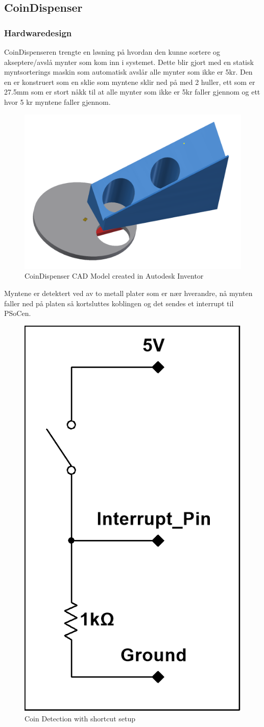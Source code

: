 \documentclass[Rapport/Rapport_main.tex]{subfiles}
\begin{document}
\subsection{CoinDispenser}
\subsubsection{Hardwaredesign}
CoinDispenseren trengte en løsning på hvordan den kunne sortere og akseptere/avslå mynter som kom inn i systemet. Dette blir gjort med en statisk myntsorterings maskin som automatisk avslår alle mynter som ikke er 5kr. Den en er konstruert som en sklie som myntene sklir ned på med 2 huller, ett som er 27.5mm som er stort nåkk til at alle mynter som ikke er 5kr faller gjennom og ett hvor 5 kr myntene faller gjennom.

\begin{figure}[H]
    \centering
    \includegraphics[width=\linewidth]{Rapport/BallDispenser/CoinDispenser/graphics/coinmaster.png}
    \caption{CoinDispenser CAD Model created in Autodesk Inventor}
    \label{fig:CoinCAD}
\end{figure}

Myntene er detektert ved av to metall plater som er nær hverandre, nå mynten faller ned på platen så kortsluttes koblingen og det sendes et interrupt til PSoCen.

\begin{figure}[H]
    \centering
    \includegraphics[width=0.3\linewidth]{Rapport/BallDispenser/CoinDispenser/graphics/CoinDispInterrupt.png}
    \caption{Coin Detection with shortcut setup}
    \label{fig:my_label}
\end{figure}
\end{document}
